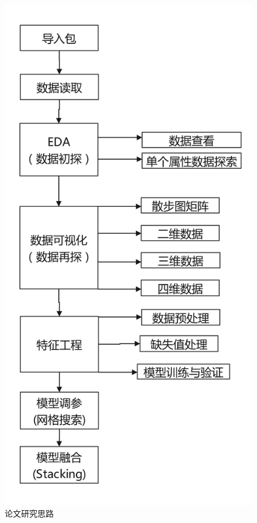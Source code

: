 \begin{figure}[htbp]
	\centering
	\includegraphics[scale=0.1,angle=0]{images/1.png}
	\caption{论文研究思路}
	\label{1}
\end{figure}


